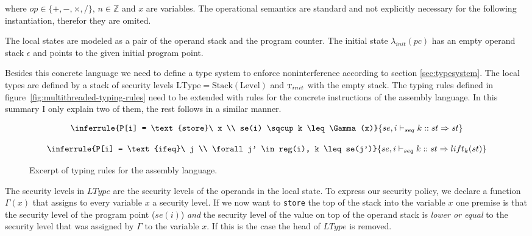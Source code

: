 \documentclass[a4paper,10pt]{llncs}
\begin{document}
where $op \in \{+,-,\times,/\}$, $n \in \mathbb{Z}$ and $x$ are variables. The
operational semantics are standard and not explicitly necessary for the following
instantiation, therefor they are omited.

The local states are modeled as a pair of the operand stack and the program counter. The
initial state $\lambda_{init}(pc)$ has an empty operand stack $\epsilon$ and points to
the given initial program point.

Besides this concrete language we need to define a type system to enforce noninterference
according to section \ref{sec:typesystem}. The local types are defined by a stack of security levels
$\text{LType} = \text{Stack}(\text{Level})$ and $\textsc{t}_{init}$ with the empty stack. The typing rules defined in
figure~\ref{fig:multithreaded-typing-rules} need to be extended with rules for the concrete instructions
of the assembly language. In this summary I only explain two of them, the rest follows
in a similar manner.

\begin{figure}
\begin{minipage}{.5\textwidth}
\begin{align*}
\inferrule{P[i] = \text{store}\ x \\ se(i) \sqcup k \leq \Gamma(x)}
{se, i \vdash_{seq} k :: st \Rightarrow st}
\end{align*}
\end{minipage}
\begin{minipage}{.5\textwidth}
\begin{align*}
\inferrule{P[i] = \text{ifeq}\ j \\ \forall j' \in reg(i), k \leq se(j')}
{se, i \vdash_{seq} k :: st \Rightarrow lift_k(st)}
\end{align*}
\end{minipage}
\caption{Excerpt of typing rules for the assembly language.}
\label{fig:transfer-rules}
\end{figure}

The security levels in $LType$ are the security levels of the operands in the local state. To
express our security policy, we declare a function $\Gamma(x)$ that assigns to every variable
$x$ a security level. If we now want to \texttt{store} the top of the stack into the variable
$x$ one premise is that the security level of the program point ($se(i)$) \textit{and} the
security level of the value on top of the operand stack is \textit{lower or equal} to the
security level that was assigned by $\Gamma$ to the variable $x$. If this is the case the head
of $LType$ is removed.
\end{document}
